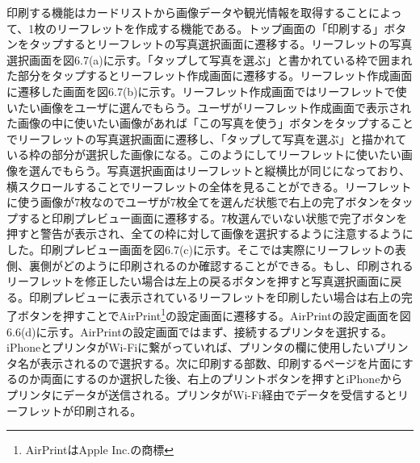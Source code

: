 印刷する機能はカードリストから画像データや観光情報を取得することによって、1枚のリーフレットを作成する機能である。トップ画面の「印刷する」ボタンをタップするとリーフレットの写真選択画面に遷移する。リーフレットの写真選択画面を図6.7(a)に示す。「タップして写真を選ぶ」と書かれている枠で囲まれた部分をタップするとリーフレット作成画面に遷移する。リーフレット作成画面に遷移した画面を図6.7(b)に示す。リーフレット作成画面ではリーフレットで使いたい画像をユーザに選んでもらう。ユーザがリーフレット作成画面で表示された画像の中に使いたい画像があれば「この写真を使う」ボタンをタップすることでリーフレットの写真選択画面に遷移し、「タップして写真を選ぶ」と描かれている枠の部分が選択した画像になる。このようにしてリーフレットに使いたい画像を選んでもらう。写真選択画面はリーフレットと縦横比が同じになっており、横スクロールすることでリーフレットの全体を見ることができる。リーフレットに使う画像が7枚なのでユーザが7枚全てを選んだ状態で右上の完了ボタンをタップすると印刷プレビュー画面に遷移する。7枚選んでいない状態で完了ボタンを押すと警告が表示され、全ての枠に対して画像を選択するように注意するようにした。印刷プレビュー画面を図6.7(c)に示す。そこでは実際にリーフレットの表側、裏側がどのように印刷されるのか確認することができる。もし、印刷されるリーフレットを修正したい場合は左上の戻るボタンを押すと写真選択画面に戻る。印刷プレビューに表示されているリーフレットを印刷したい場合は右上の完了ボタンを押すことでAirPrint\footnote{AirPrintはApple Inc.の商標}の設定画面に遷移する。AirPrintの設定画面を図6.6(d)に示す。AirPrintの設定画面ではまず、接続するプリンタを選択する。iPhoneとプリンタがWi-Fiに繋がっていれば、プリンタの欄に使用したいプリンタ名が表示されるので選択する。次に印刷する部数、印刷するページを片面にするのか両面にするのか選択した後、右上のプリントボタンを押すとiPhoneからプリンタにデータが送信される。プリンタがWi-Fi経由でデータを受信するとリーフレットが印刷される。
